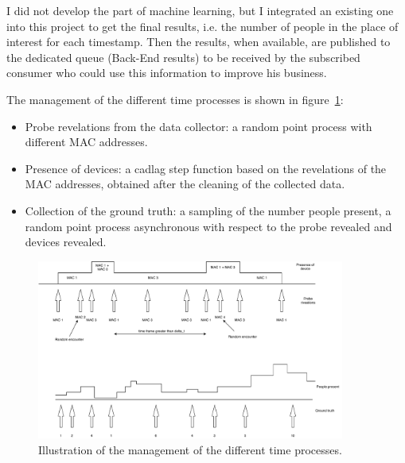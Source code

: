 I did not develop the part of machine learning, but I integrated an existing one into this project to get the final results, i.e. the number of people in the place of interest for each timestamp. Then the results, when available, are published to the dedicated queue (Back-End results) to be received by the subscribed consumer who could use this information to improve his business.

The management of the different time processes is shown in figure~\ref{fig:timeprocesses}:
\begin{itemize}
  \item Probe revelations from the data collector: a random point process with different MAC addresses.
  \item Presence of devices: a cadlag step function based on the revelations of the MAC addresses, obtained after the cleaning of the collected data.
  \item Collection of the ground truth: a sampling of the number people present, a random point process asynchronous with respect to the probe revealed and devices revealed.
\end{itemize}

\begin{figure}[h]
\centering 
\includegraphics[width=0.9\textwidth]{images/timeprocesses} 
\caption{Illustration of the management of the different time processes.}
\label{fig:timeprocesses}
\end{figure}
